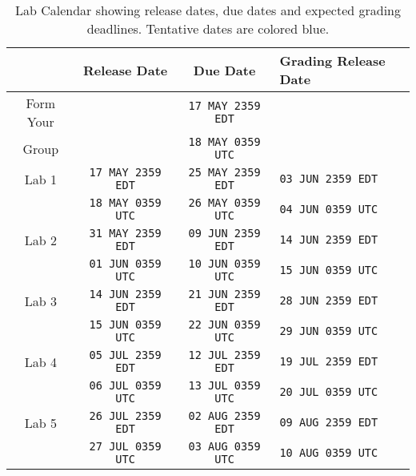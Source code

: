 %
\begin{table}
  \centering
  \begin{tabular}{c|c|c|l}
      & Release Date & Due Date & Grading Release Date\\ \hline
    Form Your
      &
      & \texttt{17 MAY 2359 EDT}
      & \\
    Group
      &
      & \texttt{18 MAY 0359 UTC}
      & \\ \hline
    Lab 1
      & \texttt{17 MAY 2359 EDT}
      & \texttt{25 MAY 2359 EDT}
      & {\texttt{03 JUN 2359 EDT}}\\
      & \texttt{18 MAY 0359 UTC}
      & \texttt{26 MAY 0359 UTC}
      & {\texttt{04 JUN 0359 UTC}}\\ \hline
    Lab 2
      & {\texttt{31 MAY 2359 EDT}}
      & {\texttt{09 JUN 2359 EDT}}
      & {\color{blue}\texttt{14 JUN 2359 EDT}}\\
      & {\texttt{01 JUN 0359 UTC}}
      & {\texttt{10 JUN 0359 UTC}}
      & {\color{blue}\texttt{15 JUN 0359 UTC}}\\ \hline
    Lab 3
      & {\color{blue}\texttt{14 JUN 2359 EDT}}
      & {\color{blue}\texttt{21 JUN 2359 EDT}}
      & {\color{blue}\texttt{28 JUN 2359 EDT}}\\
      & {\color{blue}\texttt{15 JUN 0359 UTC}}
      & {\color{blue}\texttt{22 JUN 0359 UTC}}
      & {\color{blue}\texttt{29 JUN 0359 UTC}}\\ \hline
    Lab 4
      & {\color{blue}\texttt{05 JUL 2359 EDT}}
      & {\color{blue}\texttt{12 JUL 2359 EDT}}
      & {\color{blue}\texttt{19 JUL 2359 EDT}}\\
      & {\color{blue}\texttt{06 JUL 0359 UTC}}
      & {\color{blue}\texttt{13 JUL 0359 UTC}}
      & {\color{blue}\texttt{20 JUL 0359 UTC}}\\ \hline
    Lab 5
      & {\color{blue}\texttt{26 JUL 2359 EDT}}
      & {\color{blue}\texttt{02 AUG 2359 EDT}}
      & {\color{blue}\texttt{09 AUG 2359 EDT}}\\
      & {\color{blue}\texttt{27 JUL 0359 UTC}}
      & {\color{blue}\texttt{03 AUG 0359 UTC}}
      & {\color{blue}\texttt{10 AUG 0359 UTC}}
  \end{tabular}
  \caption[Lab Calendar]{%
    Lab Calendar showing release dates, due dates and expected grading
    deadlines. Tentative dates are colored blue.
  }
  \label{tab:labcalendar}
\end{table}
